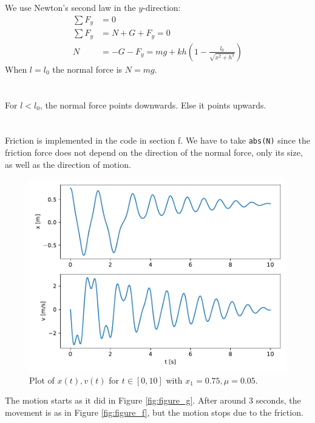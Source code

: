\documentclass[a4paper,10pt,english]{article}
\begin{document}
\section{}
We use Newton's second law in the $y$-direction:
\begin{align*}
    \sum F_y &= 0 \\
    \sum F_y &= N+G+F_y = 0 \\
    N &= -G-F_y = mg + k h
        \left( 
            1 - \frac{l_0}{\sqrt{x^2+h^2}}
        \right)
\end{align*}
When $l=l_0$ the normal force is $N=mg$.

\section{}
For $l<l_0$, the normal force points downwards. Else it points upwards.

\newpage
\section{}
Friction is implemented in the code in section f. We have to take \verb|abs(N)| since the friction force does not depend on the direction of the normal force, only its size, as well as the direction of motion.

\begin{figure}[h]
    \centering
    \includegraphics[scale=0.7]{figure_k.pdf}
    \caption{Plot of $x(t), v(t)$ for $t\in[0, 10]$ with $x_1=0.75, \mu=0.05$.}
    \label{fig:figure_k}
\end{figure}
The motion  starts as it did in Figure \ref{fig:figure_g}. After around 3 seconds, the movement is as in Figure \ref{fig:figure_f}, but the motion stops due to the friction.
\end{document}
